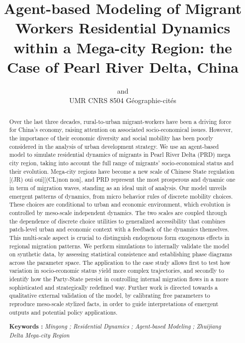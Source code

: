 

\def \draft {1}



\title{Agent-based Modeling of Migrant Workers Residential Dynamics within a Mega-city Region: the Case of Pearl River Delta, China
}
\author{ and \\
UMR CNRS 8504 Géographie-cités
}
\date{}




\maketitle

\justify


\begin{abstract}
Over the last three decades, rural-to-urban migrant-workers have been a driving force for China's economy, raising attention on associated socio-economical issues. However, the importance of their economic diversity and social mobility has been poorly considered in the analysis of urban development strategy.
We use an agent-based model to simulate residential dynamics of migrants in Pearl River Delta (PRD) mega city region, taking into account the full range of migrants’ socio-economical status and their evolution. Mega-city regions have become a new scale of Chinese State regulation [(JR) oui oui][(CL)non non], and PRD represent the most prosperous and dynamic one in term of migration waves, standing as an ideal unit of analysis.
Our model unveils emergent patterns of dynamics, from micro behavior rules of discrete mobility choices. These choices are conditional to urban and economic environment, which evolution is controlled by meso-scale independent dynamics.
The two scales are coupled through the dependence of discrete choice utilities to generalized accessibility that combines patch-level urban and economic context with a feedback of the dynamics themselves. This multi-scale aspect is crucial to distinguish endogenous form exogenous effects in regional migration patterns.
We perform simulations to internally validate the model on synthetic data, by assessing statistical consistence and establishing phase diagrams across the parameter space.
The application to the case study allows first to test how variation in socio-economic status yield more complex trajectories, and secondly to identify how the Party-State persist in controlling internal migration flows in a more sophisticated and strategically redefined way.
Further work is directed towards a qualitative external validation of the model, by calibrating free parameters to reproduce meso-scale stylized facts, in order to guide interpretations of emergent outputs and potential policy applications.

\bigskip

\noindent\textbf{Keywords : } \textit{Mingong ; Residential Dynamics ; Agent-based Modeling ; Zhuijiang Delta Mega-city Region}
\end{abstract}




